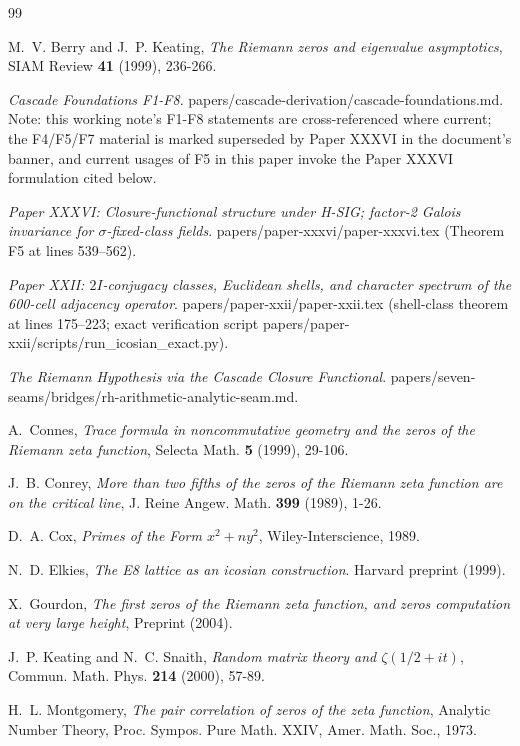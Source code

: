 \documentclass[11pt, a4paper]{amsart}
\theoremstyle{definition}
\begin{document}
\begin{thebibliography}{99}

M.~V. Berry and J.~P. Keating, \emph{The Riemann zeros and eigenvalue asymptotics},
SIAM Review \textbf{41} (1999), 236-266.

\emph{Cascade Foundations F1-F8}. papers/cascade-derivation/cascade-foundations.md.
Note: this working note's F1-F8 statements are cross-referenced
where current; the F4/F5/F7 material is marked superseded by
Paper XXXVI in the document's banner, and current usages of F5 in
this paper invoke the Paper XXXVI formulation cited below.

\emph{Paper XXXVI: Closure-functional structure under H-SIG;
factor-2 Galois invariance for $\sigma$-fixed-class fields}.
papers/paper-xxxvi/paper-xxxvi.tex (Theorem F5 at lines 539--562).

\emph{Paper XXII: $2I$-conjugacy classes, Euclidean shells, and
character spectrum of the 600-cell adjacency operator}.
papers/paper-xxii/paper-xxii.tex (shell-class theorem at lines
175--223; exact verification script
papers/paper-xxii/scripts/run\_icosian\_exact.py).

\emph{The Riemann Hypothesis via the Cascade Closure Functional}.
papers/seven-seams/bridges/rh-arithmetic-analytic-seam.md.

A.~Connes, \emph{Trace formula in noncommutative geometry and the zeros of the Riemann zeta function},
Selecta Math. \textbf{5} (1999), 29-106.

J.~B. Conrey, \emph{More than two fifths of the zeros of the Riemann zeta function are on the critical line},
J. Reine Angew. Math. \textbf{399} (1989), 1-26.

D.~A. Cox, \emph{Primes of the Form $x^2 + ny^2$},
Wiley-Interscience, 1989.

N.~D. Elkies, \emph{The E8 lattice as an icosian construction}.
Harvard preprint (1999).

X.~Gourdon, \emph{The first zeros of the Riemann zeta function, and zeros computation at very large height},
Preprint (2004).

J.~P. Keating and N.~C. Snaith, \emph{Random matrix theory and $\zeta(1/2 + it)$},
Commun. Math. Phys. \textbf{214} (2000), 57-89.

H.~L. Montgomery, \emph{The pair correlation of zeros of the zeta function},
Analytic Number Theory, Proc. Sympos. Pure Math. XXIV, Amer. Math. Soc., 1973.


\end{thebibliography}
\end{document}
